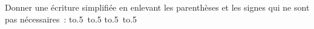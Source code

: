 \documentclass[exercice]{thedocument}%
\begin{document}
%
Donner une écriture simplifiée en enlevant les parenthèses et les signes qui
ne sont pas nécessaires~:\vskip10pt\noindent
\hbox{\hbox to.5%
    \hbox to.5}\vskip10pt
\hbox{\hbox to.5%
    \hbox to.5}
\end{document}
